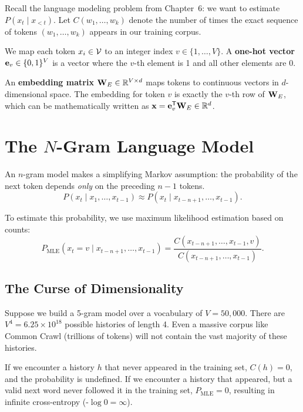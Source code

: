 Recall the language modeling problem from Chapter~6: we want to estimate $P(x_t \mid x_{<t})$.
Let $C(w_1, \dots, w_k)$ denote the number of times the exact sequence of tokens $(w_1, \dots, w_k)$ appears in our training corpus.

We map each token $x_i \in \mathcal{V}$ to an integer index $v \in \{1, \dots, V\}$. A \textbf{one-hot vector} $\mathbf{e}_v \in \{0,1\}^V$ is a vector where the $v$-th element is 1 and all other elements are 0.

An \textbf{embedding matrix} $\mathbf{W}_E \in \mathbb{R}^{V \times d}$ maps tokens to continuous vectors in $d$-dimensional space. The embedding for token $v$ is exactly the $v$-th row of $\mathbf{W}_E$, which can be mathematically written as $\mathbf{x} = \mathbf{e}_v^{\mathsf{T}} \mathbf{W}_E \in \mathbb{R}^d$.

\section{The $N$-Gram Language Model}
\label{ch:08:sec:main}

An $n$-gram model makes a simplifying Markov assumption: the probability of the next token depends \emph{only} on the preceding $n-1$ tokens.
\begin{equation}
P(x_t \mid x_1, \dots, x_{t-1}) \approx P(x_t \mid x_{t-n+1}, \dots, x_{t-1}).
\end{equation}

To estimate this probability, we use maximum likelihood estimation based on counts:
\begin{equation}
P_{\text{MLE}}(x_t = v \mid x_{t-n+1}, \dots, x_{t-1}) = \frac{C(x_{t-n+1}, \dots, x_{t-1}, v)}{C(x_{t-n+1}, \dots, x_{t-1})}.
\end{equation}

\subsection{The Curse of Dimensionality}

Suppose we build a 5-gram model over a vocabulary of $V = 50,000$. There are $V^4 = 6.25 \times 10^{18}$ possible histories of length 4. Even a massive corpus like Common Crawl (trillions of tokens) will not contain the vast majority of these histories. 

If we encounter a history $h$ that never appeared in the training set, $C(h) = 0$, and the probability is undefined. If we encounter a history that appeared, but a valid next word never followed it in the training set, $P_{\text{MLE}} = 0$, resulting in infinite cross-entropy (-$\log 0 = \infty$). 

